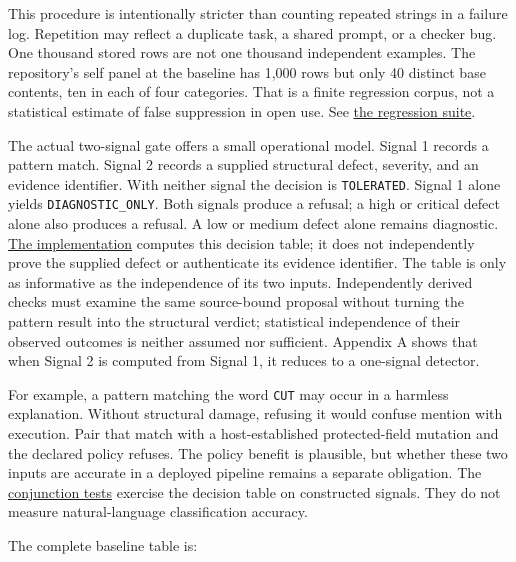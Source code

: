\documentclass[
  11pt,
]{article}
\newcommand{\passthrough}[1]{#1}
\begin{document}
This procedure is intentionally stricter than counting repeated strings
in a failure log. Repetition may reflect a duplicate task, a shared
prompt, or a checker bug. One thousand stored rows are not one thousand
independent examples. The repository's self panel at the baseline has
1,000 rows but only 40 distinct base contents, ten in each of four
categories. That is a finite regression corpus, not a statistical
estimate of false suppression in open use. See
\href{https://github.com/dbccpage/the_symbol_game/blob/52cb5457f6c485ba548cfd292f6012a941ed22cf/symbol_game/tests/test_immune_defect_regressions.py}{the
regression suite}.

The actual two-signal gate offers a small operational model. Signal 1
records a pattern match. Signal 2 records a supplied structural defect,
severity, and an evidence identifier. With neither signal the decision
is \passthrough{\lstinline!TOLERATED!}. Signal 1 alone yields
\texttt{\nolinkurl{DIAGNOSTIC_ONLY}}. Both signals produce a
refusal; a high or critical defect alone also produces a refusal. A low
or medium defect alone remains diagnostic.
\href{https://github.com/dbccpage/the_symbol_game/blob/52cb5457f6c485ba548cfd292f6012a941ed22cf/symbol_game/domain/immune/danger_gate.py}{The
implementation} computes this decision table; it does not independently
prove the supplied defect or authenticate its evidence identifier. The
table is only as informative as the independence of its two inputs.
Independently derived checks must examine the same source-bound proposal
without turning the pattern result into the structural verdict;
statistical independence of their observed outcomes is neither assumed
nor sufficient. Appendix A shows that when Signal 2 is computed from
Signal 1, it reduces to a one-signal detector.

For example, a pattern matching the word \passthrough{\lstinline!CUT!}
may occur in a harmless explanation. Without structural damage, refusing
it would confuse mention with execution. Pair that match with a
host-established protected-field mutation and the declared policy
refuses. The policy benefit is plausible, but whether these two inputs
are accurate in a deployed pipeline remains a separate obligation. The
\href{https://github.com/dbccpage/the_symbol_game/blob/52cb5457f6c485ba548cfd292f6012a941ed22cf/symbol_game/tests/mssn_sn_demos/test_demo_immune_strict.py}{conjunction
tests} exercise the decision table on constructed signals. They do not
measure natural-language classification accuracy.

The complete baseline table is:
\end{document}
